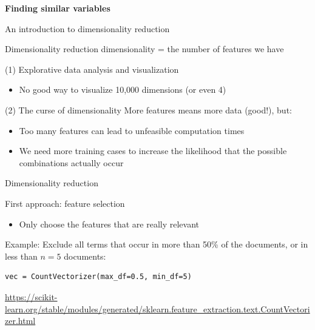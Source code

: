 \documentclass[compress]{beamer}
\begin{document}
\begin{frame}[plain]
\textbf{Finding similar variables}

An introduction to dimensionality reduction
\end{frame}


\begin{frame}{Dimensionality reduction}
dimensionality = the number of features we have



\begin{block}{(1) Explorative data analysis and visualization}
\begin{itemize}
\item No good way to visualize 10,000 dimensions (or even 4)
\end{itemize}
\end{block}

\pause


\begin{block}{(2) The curse of dimensionality}
More features means more data (good!), but:
\begin{itemize}
\item Too many features can lead to unfeasible computation times
\item We need more training cases to increase the likelihood that the possible combinations actually occur
\end{itemize}
\end{block}
\end{frame}



\begin{frame}[fragile]{Dimensionality reduction}

\begin{block}{First approach: feature selection}
\begin{itemize}
\item Only choose the features that are really relevant
\end{itemize}
\end{block}


Example: Exclude all terms that occur in more than 50\% of the documents, or in less than $n=5$ documents:

\begin{lstlisting}
vec = CountVectorizer(max_df=0.5, min_df=5)
\end{lstlisting}

\tiny{\url{https://scikit-learn.org/stable/modules/generated/sklearn.feature\_extraction.text.CountVectorizer.html}}

\end{frame}
\end{document}
